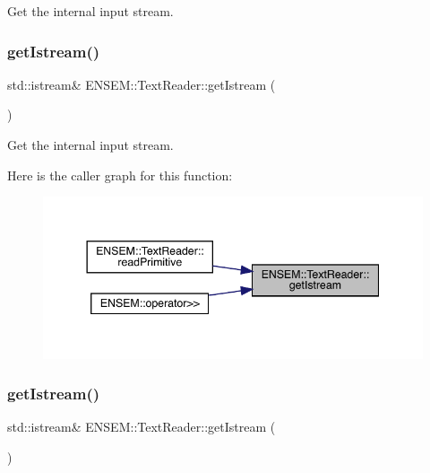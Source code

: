 Get the internal input stream. 

\mbox{\label{classENSEM_1_1TextReader_a855b7272df1bd50c18f730f3ac882428}} 
\subsubsection{\texorpdfstring{getIstream()}{getIstream()}\hspace{0.1cm}{\footnotesize\ttfamily [2/3]}}
{\footnotesize\ttfamily std\+::istream\& E\+N\+S\+E\+M\+::\+Text\+Reader\+::get\+Istream (\begin{DoxyParamCaption}{ }\end{DoxyParamCaption})\hspace{0.3cm}{\ttfamily [inline]}}



Get the internal input stream. 

Here is the caller graph for this function\+:
\nopagebreak
\begin{figure}[H]
\begin{center}
\leavevmode
\includegraphics[width=344pt]{d4/d23/classENSEM_1_1TextReader_a855b7272df1bd50c18f730f3ac882428_icgraph}
\end{center}
\end{figure}
\mbox{\label{classENSEM_1_1TextReader_a855b7272df1bd50c18f730f3ac882428}} 
\subsubsection{\texorpdfstring{getIstream()}{getIstream()}\hspace{0.1cm}{\footnotesize\ttfamily [3/3]}}
{\footnotesize\ttfamily std\+::istream\& E\+N\+S\+E\+M\+::\+Text\+Reader\+::get\+Istream (\begin{DoxyParamCaption}{ }\end{DoxyParamCaption})\hspace{0.3cm}{\ttfamily [inline]}}



